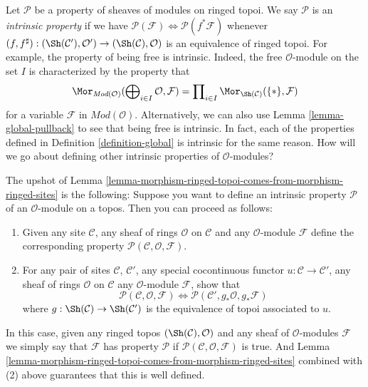 \noindent
Let $\mathcal{P}$ be a property of sheaves of modules on ringed topoi.
We say $\mathcal{P}$ is an {\it intrinsic property} if we have
$\mathcal{P}(\mathcal{F}) \Leftrightarrow \mathcal{P}(f^*\mathcal{F})$
whenever $(f, f^\sharp) :
(\Sh(\mathcal{C}'), \mathcal{O}')
\to
(\Sh(\mathcal{C}), \mathcal{O})$
is an equivalence of ringed topoi.
For example, the property of being free is intrinsic. Indeed, the free
$\mathcal{O}$-module on the set $I$ is characterized by the property
that
$$
\Mor_{\textit{Mod}(\mathcal{O})}(
\bigoplus\nolimits_{i \in I} \mathcal{O},
\mathcal{F})
=
\prod\nolimits_{i \in I} \Mor_{\Sh(\mathcal{C})}(\{*\},
\mathcal{F})
$$
for a variable $\mathcal{F}$ in $\textit{Mod}(\mathcal{O})$.
Alternatively, we can also use Lemma \ref{lemma-global-pullback}
to see that being free is intrinsic. In fact, each of the properties
defined in Definition \ref{definition-global} is intrinsic for the
same reason.
How will we go about defining other intrinsic properties of
$\mathcal{O}$-modules?

\medskip\noindent
The upshot of
Lemma \ref{lemma-morphism-ringed-topoi-comes-from-morphism-ringed-sites}
is the following: Suppose you want to define
an intrinsic property $\mathcal{P}$ of an $\mathcal{O}$-module on a
topos. Then you can proceed as follows:
\begin{enumerate}
\item Given any site $\mathcal{C}$, any sheaf of rings $\mathcal{O}$
on $\mathcal{C}$ and any $\mathcal{O}$-module $\mathcal{F}$
define the corresponding
property $\mathcal{P}(\mathcal{C}, \mathcal{O}, \mathcal{F})$.
\item For any pair of sites $\mathcal{C}$, $\mathcal{C}'$, any
special cocontinuous functor $u : \mathcal{C} \to \mathcal{C}'$,
any sheaf of rings $\mathcal{O}$ on $\mathcal{C}$ any
$\mathcal{O}$-module $\mathcal{F}$, show that
$$
\mathcal{P}(\mathcal{C}, \mathcal{O}, \mathcal{F})
\Leftrightarrow
\mathcal{P}(\mathcal{C}', g_*\mathcal{O}, g_*\mathcal{F})
$$
where $g : \Sh(\mathcal{C}) \to \Sh(\mathcal{C}')$
is the equivalence of topoi associated to $u$.
\end{enumerate}
In this case, given any ringed topos $(\Sh(\mathcal{C}), \mathcal{O})$
and any sheaf of $\mathcal{O}$-modules $\mathcal{F}$ we simply say that
$\mathcal{F}$ has property $\mathcal{P}$ if
$\mathcal{P}(\mathcal{C}, \mathcal{O}, \mathcal{F})$ is true.
And Lemma \ref{lemma-morphism-ringed-topoi-comes-from-morphism-ringed-sites}
combined with (2) above guarantees that this is well defined.

